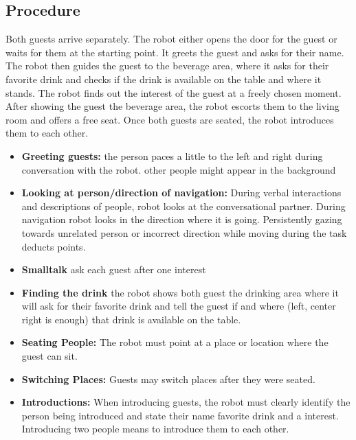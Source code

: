 \subsection*{Procedure}
Both guests arrive separately. The robot either opens the door for the guest or waits for them at the starting point. It greets the guest and asks for their name. The robot then guides the guest to the beverage area, where it asks for their favorite drink and checks if the drink is available on the table and where it stands. The robot finds out the interest of the guest at a freely chosen moment. After showing the guest the beverage area, the robot escorts them to the living room and offers a free seat. Once both guests are seated, the robot introduces them to each other.
\begin{itemize}
	\item \textbf{Greeting guests:} the person paces a little to the left and right during conversation with the robot. other people might appear in the background
	
	\item \textbf{Looking at person/direction of navigation:} During verbal interactions and descriptions of people, robot 
	looks at the conversational partner. During navigation robot looks in the direction where it is going. Persistently gazing towards unrelated 
	person or incorrect direction while moving during the task deducts points.
    
    \item \textbf{Smalltalk} ask each guest after one interest 
    
    \item \textbf{Finding the drink} the robot shows both guest the drinking area where it will ask for their favorite drink and tell the guest if and where (left, center right is enough) that drink is available on the table. 
	
	\item \textbf{Seating People:} The robot must point at a place or location where the guest can sit.
	
	\item \textbf{Switching Places:} Guests may switch places after they were seated.
	
	\item \textbf{Introductions:} When introducing guests, the robot must clearly identify the person being introduced and state their name favorite drink and a interest. Introducing two people means to introduce them to each other. 
\end{itemize}

